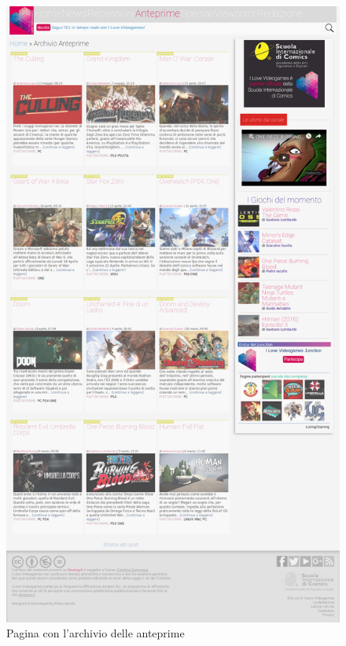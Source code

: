 \documentclass[../ProgettoTecWeb2.tex]{subfiles}
\begin{document}
	\begin{figure} [H]
			\centering
			\includegraphics[scale=0.24]{img/AnteprimeCompleta}
			\caption{Pagina con l'archivio delle anteprime}
	\end{figure}
\end{document}
